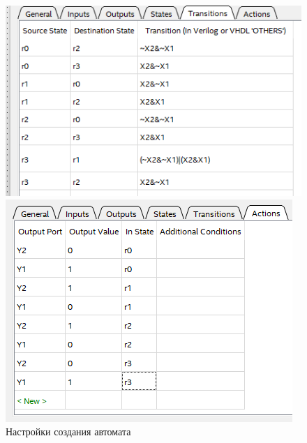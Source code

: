\documentclass[a4paper,12pt]{article}
\begin{document}
\begin{figure}[H]
        \begin{minipage}{0.45\linewidth}
            \includegraphics[width=\linewidth]{polytech/scheme/report-lab4/subfiles/images/smw4}
        \end{minipage}
        \begin{minipage}{0.45\linewidth}
            \includegraphics[width=\linewidth]{polytech/scheme/report-lab4/subfiles/images/smw5}
        \end{minipage}
        \caption{Настройки создания автомата}
    \end{figure}
\end{document}
